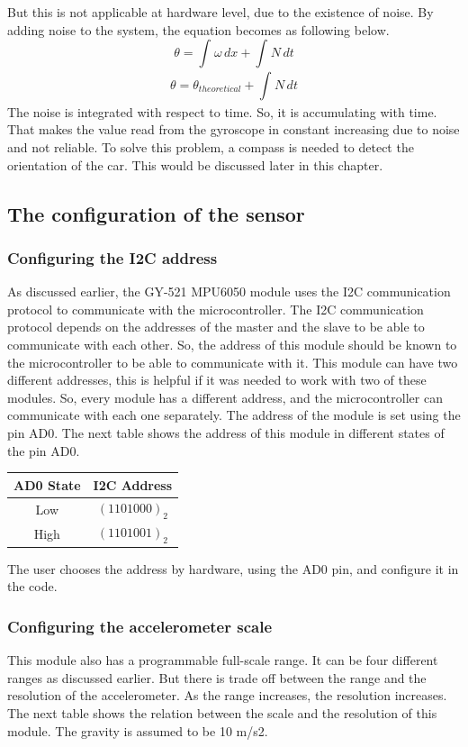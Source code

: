 But this is not applicable at hardware level, due to the existence of noise. By adding noise to the system, the equation becomes as following below.
\[ \theta = \int_{}^{} \omega \,dx + \int_{}^{} N \,dt \]
\[ \theta = \theta_{theoretical} + \int_{}^{} N \,dt \]
The noise is integrated with respect to time. So, it  is accumulating with time. That makes the value read from the gyroscope in constant increasing due to noise and not reliable.
To solve this problem, a compass is needed to detect the orientation of the car. This would be discussed later in this chapter.

\subsection{The configuration of the sensor}
\subsubsection{Configuring the I2C address}
As discussed earlier, the GY-521 MPU6050 module uses the I2C communication protocol to communicate with the microcontroller. The I2C communication protocol depends on the addresses of the master and the slave to be able to communicate with each other. So, the address of this module should be known to the microcontroller to be able to communicate with it.
This module can have two different addresses, this is helpful if it was needed to work with two of these modules. So, every module has a different address, and the microcontroller can communicate with each one separately. The address of the module is set using the pin AD0. The next table shows the address of this module in different states of the pin AD0.
\begin{table}[h]
\def\arraystretch{1.5}
\centering
\begin{tabular}{| c | c |}
\hline
 \textbf{AD0 State} &  \textbf{I2C Address} \\
 \hline
 Low &  $(1101000)_2$ \\
 \hline
 High & $(1101001)_2$ \\
 \hline
\end{tabular}
\end{table}

The user chooses the address by hardware, using the AD0 pin, and configure it in the code.
\clearpage
\subsubsection{Configuring the accelerometer scale}
This module also has a programmable full-scale range. It can be four different ranges as discussed earlier. But there is trade off between the range and the resolution of the accelerometer. As the range increases, the resolution increases. The next table shows the relation between the scale and the resolution of this module. The gravity is assumed to be 10 m/s2.

